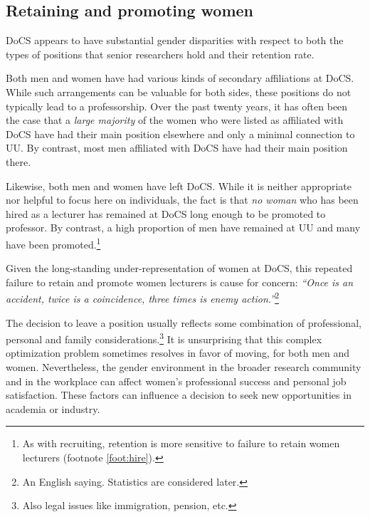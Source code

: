 \documentclass[a4paper,10pt,twocolumn]{article}
\begin{document}
\subsection*{Retaining and promoting women}

DoCS appears to have substantial gender disparities with respect to
both the types of positions that senior researchers hold and their
retention rate.


Both men and women have had various kinds of secondary affiliations at
DoCS.  While such arrangements can be valuable for both sides, these
positions do not typically lead to a professorship.  Over the past
twenty years, it has often been the case that a \emph{large majority}
of the women who were listed as affiliated with DoCS have had their
main position elsewhere and only a minimal connection to UU.  By
contrast, most men affiliated with DoCS have had their main position
there.

Likewise, both men and women have left DoCS.  While it is neither
appropriate nor helpful to focus here on individuals, the fact is that
\emph{no woman} who has been hired as a lecturer has remained at DoCS
long enough to be promoted to professor.  By contrast, a high
proportion of men have remained at UU and many have been
promoted.\footnote{As with recruiting, retention is more sensitive to
failure to retain women lecturers (footnote
\footnotesize{\ref{foot:hire}}).}



Given the long-standing under-representation of women at DoCS, this
repeated failure to retain and promote women lecturers is cause for
concern: \emph{``Once is an accident, twice is a coincidence, three
times is enemy action.''}\footnote{An English saying. Statistics are
considered later.}


The decision to leave a position usually reflects some combination of
professional, personal and family considerations.\footnote{Also legal
issues like immigration, pension, etc.}  It is unsurprising that this
complex optimization problem sometimes resolves in favor of moving,
for both men and women.  Nevertheless, the gender environment in the
broader research community and in the workplace can affect women's
professional success and personal job satisfaction.  These factors can
influence a decision to seek new opportunities in academia or
industry.
\end{document}
